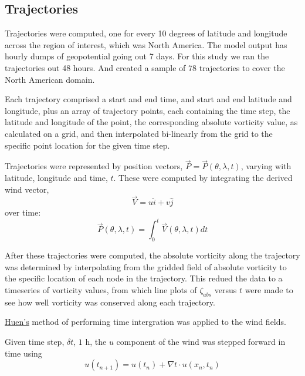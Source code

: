 \documentclass{article}
\begin{document}
\subsection{Trajectories}
Trajectories were computed,
one for every 10 degrees of latitude and longitude across the region of
interest, which was North America. The model output has hourly dumps of geopotential going out 7 days. For this study we ran the trajectories out 48 hours.  And created a sample of 78 trajectories to cover the North American domain.

Each trajectory comprised a start and end time, and start and end latitude and longitude, plus an array of trajectory points, each containing the time step, the latitude and longitude of the point, the corresponding absolute vorticity value, as calculated on a grid, and then interpolated bi-linearly from the grid to the specific point location for the given time step.

Trajectories were represented by position vectors,
$\vec{P} = \vec{P}(\theta,\lambda,t)$, varying with latitude, longitude and time, $t$. These were computed by integrating the derived wind vector,
\begin{equation}
  \vec{V} = u \hat{i} + v \hat{j}
\end{equation}
over time:
\begin{equation}
  \vec{P}(\theta,\lambda, t) =  \int_{0}^{t}
  \vec{V}(\theta ,\lambda ,t)  dt
\end{equation}

After these trajectories were computed,
the absolute vorticity along the trajectory was determined by interpolating from the
gridded field of absolute vorticity to the specific location of each node in the trajectory. This redued the data to a timeseries of vorticity values, from which
line plots of $\zeta_{abs}$ versus $t$ were made
to see how well vorticity was conserved along each trajectory.


\href{https://en.wikipedia.org/wiki/Heun%27s_method}{Huen's} method of performing time intergration was applied to the wind fields.

  Given time step, $\delta t$, $\text{1 h}$, the $u$ component of the wind was stepped forward in time using
  \begin{equation}
    u(t_{n+1}) = u(t_{n}) + \nabla t \cdot u(x_{n}, t_{n})
   \end{equation}
\end{document}
